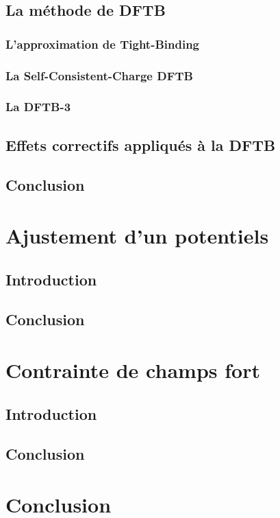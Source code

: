 \documentclass[oneside,finale,10pt]{report}
\begin{document}
\section{La méthode de DFTB}

\subsection{L'approximation de Tight-Binding}
\subsection{La Self-Consistent-Charge DFTB}
\subsection{La DFTB-3}

\section{Effets correctifs appliqués à la DFTB}

\section{Conclusion}

\chapter{Ajustement d'un potentiels}

\section{Introduction}

\section{Conclusion}

\chapter{Contrainte de champs fort}

\section{Introduction}

\section{Conclusion}

\chapter*{Conclusion}






\end{document}
